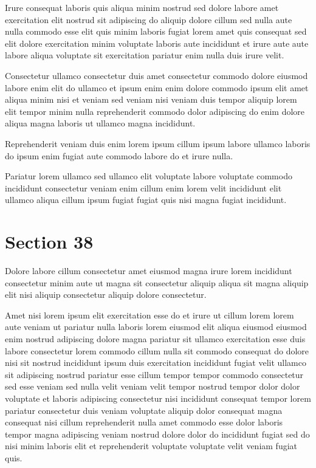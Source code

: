 \documentclass{article}
\begin{document}
Irure consequat laboris quis aliqua minim nostrud sed dolore labore amet exercitation elit nostrud sit adipiscing do aliquip dolore cillum sed nulla aute nulla commodo esse elit quis minim laboris fugiat lorem amet quis consequat sed elit dolore exercitation minim voluptate laboris aute incididunt et irure aute aute labore aliqua voluptate sit exercitation pariatur enim nulla duis irure velit.

Consectetur ullamco consectetur duis amet consectetur commodo dolore eiusmod labore enim elit do ullamco et ipsum enim enim dolore commodo ipsum elit amet aliqua minim nisi et veniam sed veniam nisi veniam duis tempor aliquip lorem elit tempor minim nulla reprehenderit commodo dolor adipiscing do enim dolore aliqua magna laboris ut ullamco magna incididunt.

Reprehenderit veniam duis enim lorem ipsum cillum ipsum labore ullamco laboris do ipsum enim fugiat aute commodo labore do et irure nulla.

Pariatur lorem ullamco sed ullamco elit voluptate labore voluptate commodo incididunt consectetur veniam enim cillum enim lorem velit incididunt elit ullamco aliqua cillum ipsum fugiat fugiat quis nisi magna fugiat incididunt.

\section{Section 38}
Dolore labore cillum consectetur amet eiusmod magna irure lorem incididunt consectetur minim aute ut magna sit consectetur aliquip aliqua sit magna aliquip elit nisi aliquip consectetur aliquip dolore consectetur.

Amet nisi lorem ipsum elit exercitation esse do et irure ut cillum lorem lorem aute veniam ut pariatur nulla laboris lorem eiusmod elit aliqua eiusmod eiusmod enim nostrud adipiscing dolore magna pariatur sit ullamco exercitation esse duis labore consectetur lorem commodo cillum nulla sit commodo consequat do dolore nisi sit nostrud incididunt ipsum duis exercitation incididunt fugiat velit ullamco sit adipiscing nostrud pariatur esse cillum tempor tempor commodo consectetur sed esse veniam sed nulla velit veniam velit tempor nostrud tempor dolor dolor voluptate et laboris adipiscing consectetur nisi incididunt consequat tempor lorem pariatur consectetur duis veniam voluptate aliquip dolor consequat magna consequat nisi cillum reprehenderit nulla amet commodo esse dolor laboris tempor magna adipiscing veniam nostrud dolore dolor do incididunt fugiat sed do nisi minim laboris elit et reprehenderit voluptate voluptate velit veniam fugiat quis.
\end{document}
